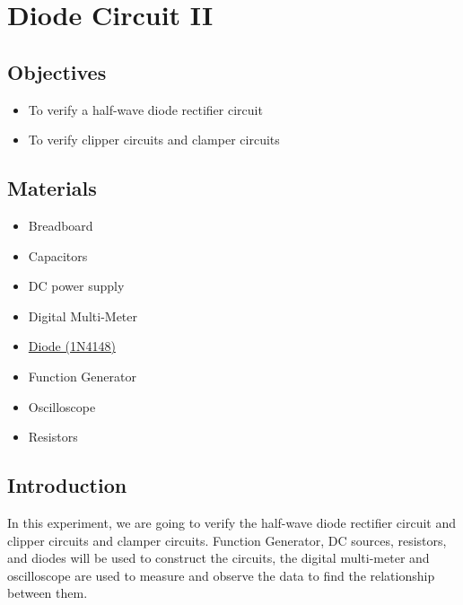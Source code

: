 \chapter{Diode Circuit II}


\section{Objectives}
\begin{itemize}
    \item To verify a half-wave diode rectifier circuit
    \item To verify clipper circuits and clamper circuits
\end{itemize}

\section{Materials}
\begin{itemize}
    \item Breadboard
    \item Capacitors
    \item DC power supply
    \item Digital Multi-Meter
    \item \hyperref[1N4148]{Diode (1N4148)}
    \item Function Generator
    \item Oscilloscope
    \item Resistors
\end{itemize}

\section{Introduction}
In this experiment, we are going to verify the half-wave diode rectifier circuit and clipper circuits and clamper circuits. Function Generator, DC sources, resistors, and diodes will be used to construct the circuits, the digital multi-meter and oscilloscope are used to measure and observe the data to find the relationship between them.\par
